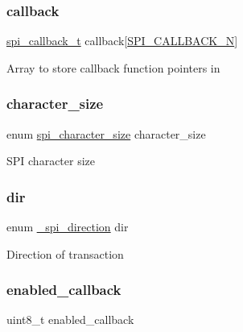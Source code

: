 \subsubsection{\texorpdfstring{callback}{callback}}
{\footnotesize\ttfamily \mbox{\hyperlink{group__asfdoc__sam0__sercom__spi__group_ga88d771c03a254735de0053be3fa513ca}{spi\+\_\+callback\+\_\+t}} callback\mbox{[}\mbox{\hyperlink{group__asfdoc__sam0__sercom__spi__group_gga4afb8830e0197ec11f6beb8140210a88a5941b69aff1bf66f116be84ddf1c1218}{S\+P\+I\+\_\+\+C\+A\+L\+L\+B\+A\+C\+K\+\_\+N}}\mbox{]}}

Array to store callback function pointers in \mbox{\label{structspi__module_a7ca9bf5df3e678e26819ff8444041797}} 
\subsubsection{\texorpdfstring{character\_size}{character\_size}}
{\footnotesize\ttfamily enum \mbox{\hyperlink{group__asfdoc__sam0__sercom__spi__group_ga79e8becd0bcea19b99e7eb7fe8a9d6b7}{spi\+\_\+character\+\_\+size}} character\+\_\+size}

S\+PI character size \mbox{\label{structspi__module_af071d306856d4f8f2f0ef443d334f5bb}} 
\subsubsection{\texorpdfstring{dir}{dir}}
{\footnotesize\ttfamily enum \mbox{\hyperlink{group__asfdoc__sam0__sercom__spi__group_ga3790f767d410bc7d70fe0772fe7044f7}{\+\_\+spi\+\_\+direction}} dir}

Direction of transaction \mbox{\label{structspi__module_a3bde421512cd5c809ecee069b5914a80}} 
\subsubsection{\texorpdfstring{enabled\_callback}{enabled\_callback}}
{\footnotesize\ttfamily uint8\+\_\+t enabled\+\_\+callback}

